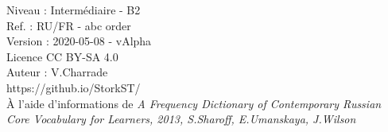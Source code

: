 \fontsize{5}{5}
\selectfont

\vspace{\baselineskip}
Niveau : Intermédiaire - B2\\
Ref. : RU/FR - abc order\\
Version : 2020-05-08 - vAlpha\\
Licence CC BY-SA 4.0\\

\noindent Auteur : V.Charrade\\
https://github.io/StorkST/\\
À l'aide d'informations de \textit{A Frequency Dictionary of Contemporary Russian Core Vocabulary for Learners, 2013, S.Sharoff, E.Umanskaya, J.Wilson}
